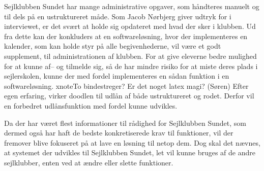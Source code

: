Sejlklubben Sundet har mange administrative opgaver, som håndteres manuelt og til dels på en ustruktureret måde. 
Som Jacob Nørbjerg giver udtryk for i interviewet, er det svært at holde sig opdateret med hvad der sker i klubben. Ud fra dette kan der konkluders at en softwareløsning, hvor der implementeres en kalender, som kan holde styr på alle begivenhederne, vil være et godt supplement, til administrationen af klubben. 
For at give eleverne bedre mulighed for at kunne af-- og tilmelde sig, så de har mindre risiko for at miste deres plads i sejlerskolen, kunne der med fordel implementeres en sådan funktion i en softwareløsning. xnote{To bindestreger? Er det noget latex magi? (Søren)}
Efter egen erfaring, virker doodlen til udlån af både ustruktureret og rodet. 
Derfor vil en forbedret udlånsfunktion med fordel kunne udvikles.

Da der har været flest informationer til rådighed for Sejlklubben Sundet, som dermed også har haft de bedste
konkretiserede krav til funktioner, vil der fremover blive fokuseret på at lave en løsning til netop dem. 
Dog skal det nævnes, at systemet der udvikles til Sejlklubben Sundet, let vil kunne bruges af de andre sejlklubber, enten ved at ændre eller slette funktioner. 

